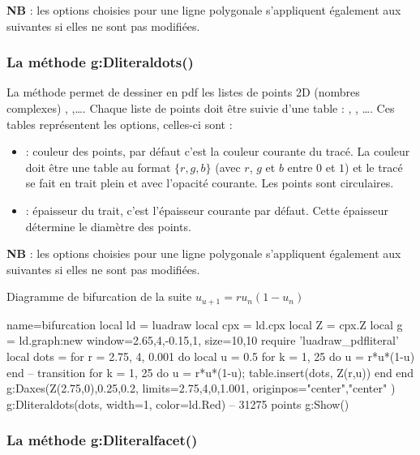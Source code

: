 \textbf{NB} : les options choisies pour une ligne polygonale s'appliquent également aux suivantes si elles ne sont pas modifiées.


\subsubsection{La méthode g:Dliteraldots()}

La méthode  permet de dessiner en pdf les listes de points 2D (nombres complexes) , ,\ldots. Chaque liste de points doit être suivie d'une table : , , \ldots. Ces tables représentent les options, celles-ci sont :
    \begin{itemize}
        \item {} : couleur des points, par défaut c'est la couleur courante du tracé. La couleur doit être une table au format $\{r,g,b\}$ (avec $r$, $g$ et $b$ entre $0$ et $1$) et le tracé se fait en trait plein et avec l'opacité courante. Les points sont circulaires.
        
        \item {} : épaisseur du trait, c'est l'épaisseur courante par défaut. Cette épaisseur détermine le diamètre des points.
    \end{itemize}

\textbf{NB} : les options choisies pour une ligne polygonale s'appliquent également aux suivantes si elles ne sont pas modifiées.


\begin{demo}{Diagramme de bifurcation de la suite $u_{u+1}=ru_n(1-u_n)$}
\begin{luadraw}{name=bifurcation}
local ld = luadraw
local cpx = ld.cpx
local Z = cpx.Z
local g = ld.graph:new{ window={2.65,4,-0.15,1}, size={10,10} }
require 'luadraw_pdfliteral'
local dots = {}
for r = 2.75, 4, 0.001 do
    local u = 0.5
    for k = 1, 25 do u = r*u*(1-u) end -- transition
    for k = 1, 25 do u = r*u*(1-u); table.insert(dots, Z(r,u)) end
end
g:Daxes({Z(2.75,0),0.25,0.2}, {limits={{2.75,4},{0,1.001}}, originpos={"center","center"} })
g:Dliteraldots(dots, {width=1, color=ld.Red}) -- 31275 points
g:Show()
\end{luadraw}
\end{demo}


\subsubsection{La méthode g:Dliteralfacet()}


